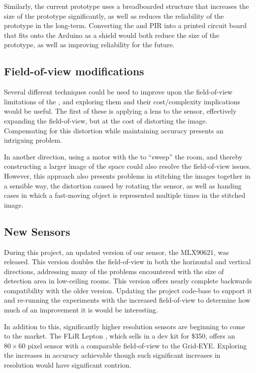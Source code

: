 \documentclass[../thesis/thesis.tex]{subfiles}
\begin{document}
Similarly, the current prototype uses a breadboarded structure that increases the size of the prototype significantly, as well as reduces the reliability of the prototype in the long-term. Converting the \mlx and PIR into a printed circuit board that fits onto the Arduino as a shield would both reduce the size of the prototype, as well as improving reliability for the future.

\subsection{Field-of-view modifications}
Several different techniques could be used to improve upon the field-of-view limitations of the \mlx, and exploring them and their cost/complexity implications would be useful. The first of these is applying a lens to the sensor, effectively expanding the field-of-view, but at the cost of distorting the image. Compensating for this distortion while maintaining accuracy presents an intriguing problem.

In another direction, using a motor with the \mlx to ``sweep'' the room, and thereby constructing a larger image of the space could also resolve the field-of-view issues. However, this approach also presents problems in stitching the images together in a sensible way, the distortion caused by rotating the sensor, as well as handing cases in which a fast-moving object is represented multiple times in the stitched image.

\subsection{New Sensors}
During this project, an updated version of our sensor, the MLX90621, was released. This version doubles the field-of-view in both the horizontal and vertical directions, addressing many of the problems encountered with the size of detection area in low-ceiling rooms. This version offers nearly complete backwards compatibility with the older version. Updating the project code-base to support it and re-running the experiments with the increased field-of-view to determine how much of an improvement it is would be interesting.

In addition to this, significantly higher resolution sensors are beginning to come to the market. The FLiR Lepton \cite{flir}, which sells in a dev kit for \$350, offers an $80 \times 60$ pixel sensor with a comparable field-of-view to the Grid-EYE. Exploring the increases in accuracy achievable though such significant increases in resolution would have significant contrion.
\end{document}
